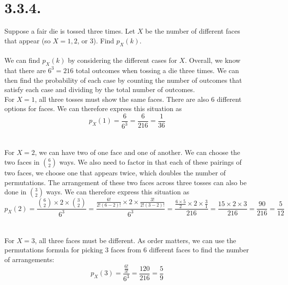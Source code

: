 \documentclass{article}
\begin{document}
{\section*{3.3.4.} 
Suppose a fair die is tossed three times. Let \(X\) be the number of different faces that appear (so \(X = 1, 2\), or \(3\)). Find \(p_X(k)\).
\\
\\
We can find \(p_X(k)\) by considering the different cases for \(X\). Overall, we know that there are \(6^3 = 216\) total outcomes when tossing a die three times. We can then find the probability of each case by counting the number of outcomes that satisfy each case and dividing by the total number of outcomes.
\\
For \(X = 1\), all three tosses must show the same faces. There are also 6 different options for faces. We can therefore express this situation as
\\
\[
p_X(1) = \frac{6}{6^3} = \frac{6}{216} = \frac{1}{36}
\]
\\ 
\\
For \(X = 2\), we can have two of one face and one of another. We can choose the two faces in \(\binom{6}{2}\) ways. We also need to factor in that each of these pairings of two faces, we choose one that appears twice, which doubles the number of permutations. The arrangement of these two faces across three tosses can also be done in \(\binom{3}{2}\) ways. We can therefore express this situation as 
\\
\[
p_X(2) = \frac{\binom{6}{2} \times 2 \times \binom{3}{2}}{6^3} = \frac{\frac{6!}{2!(6-2)!} \times 2 \times \frac{3!}{2!(3-2)!}}{6^3} = \frac{\frac{6 \times 5}{2} \times 2 \times \frac{3}{1}}{216} = \frac{15 \times 2 \times 3}{216} = \frac{90}{216} = \frac{5}{12}
\]
\\
\\
For \(X = 3\), all three faces must be different. As order  matters, we can use the permutations formula for picking 3 faces from 6 different faces to find the number of arrangements:
\\ 
\[
p_X(3) = \frac{\frac{6!}{3!}}{6^3} = \frac{120}{216} = \frac{5}{9}
\]

}
\end{document}
